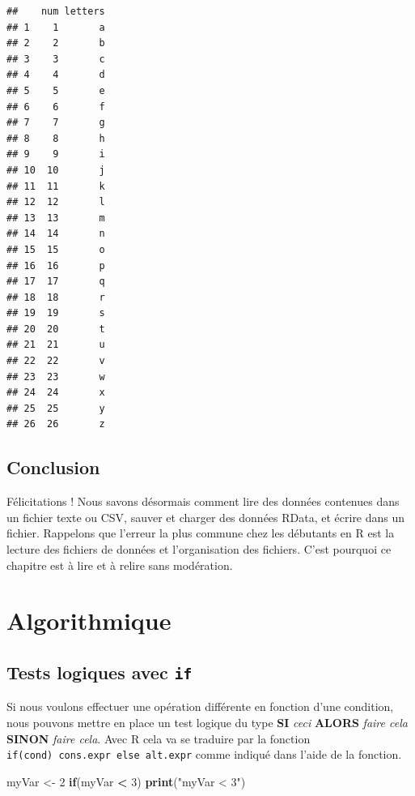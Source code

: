 \documentclass[
]{book}
\newenvironment{Shaded}{\begin{snugshade}}{\end{snugshade}}
\newcommand{\ControlFlowTok}[1]{\textcolor[rgb]{0.13,0.29,0.53}{\textbf{#1}}}
\newcommand{\DecValTok}[1]{\textcolor[rgb]{0.00,0.00,0.81}{#1}}
\newcommand{\KeywordTok}[1]{\textcolor[rgb]{0.13,0.29,0.53}{\textbf{#1}}}
\newcommand{\NormalTok}[1]{#1}
\newcommand{\OperatorTok}[1]{\textcolor[rgb]{0.81,0.36,0.00}{\textbf{#1}}}
\newcommand{\StringTok}[1]{\textcolor[rgb]{0.31,0.60,0.02}{#1}}
\begin{document}
\begin{verbatim}
##    num letters
## 1    1       a
## 2    2       b
## 3    3       c
## 4    4       d
## 5    5       e
## 6    6       f
## 7    7       g
## 8    8       h
## 9    9       i
## 10  10       j
## 11  11       k
## 12  12       l
## 13  13       m
## 14  14       n
## 15  15       o
## 16  16       p
## 17  17       q
## 18  18       r
## 19  19       s
## 20  20       t
## 21  21       u
## 22  22       v
## 23  23       w
## 24  24       x
## 25  25       y
## 26  26       z
\end{verbatim}

\hypertarget{conclusion-5}{%
\section{Conclusion}\label{conclusion-5}}

Félicitations ! Nous savons désormais comment lire des données contenues dans un fichier texte ou CSV, sauver et charger des données RData, et écrire dans un fichier. Rappelons que l'erreur la plus commune chez les débutants en R est la lecture des fichiers de données et l'organisation des fichiers. C'est pourquoi ce chapitre est à lire et à relire sans modération.

\hypertarget{algo}{%
\chapter{Algorithmique}\label{algo}}

\hypertarget{l17if}{%
\section{\texorpdfstring{Tests logiques avec \texttt{if}}{Tests logiques avec if}}\label{l17if}}

Si nous voulons effectuer une opération différente en fonction d'une condition, nous pouvons mettre en place un test logique du type \textbf{SI} \emph{ceci} \textbf{ALORS} \emph{faire cela} \textbf{SINON} \emph{faire cela}. Avec R cela va se traduire par la fonction \texttt{if(cond)\ cons.expr\ else\ alt.expr} comme indiqué dans l'aide de la fonction.

\begin{Shaded}
\begin{Highlighting}[]
\NormalTok{myVar <-}\StringTok{ }\DecValTok{2}
\ControlFlowTok{if}\NormalTok{(myVar }\OperatorTok{<}\StringTok{ }\DecValTok{3}\NormalTok{) }\KeywordTok{print}\NormalTok{(}\StringTok{"myVar < 3"}\NormalTok{)}
\end{Highlighting}
\end{Shaded}
\end{document}
